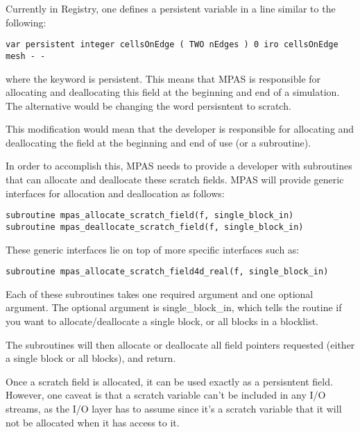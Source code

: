 \documentclass[11pt]{report}
\begin{document}
Currently in Registry, one defines a persistent variable in a line similar to the following:
\begin{lstlisting}
var persistent integer cellsOnEdge ( TWO nEdges ) 0 iro cellsOnEdge mesh - -
\end{lstlisting}

where the keyword is persistent. This means that MPAS is responsible for
allocating and deallocating this field at the beginning and end of a
simulation. The alternative would be changing the word persisntent to scratch.

This modification would mean that the developer is responsible for allocating
and deallocating the field at the beginning and end of use (or a subroutine). 

In order to accomplish this, MPAS needs to provide a developer with subroutines
that can allocate and deallocate these scratch fields. MPAS will provide
generic interfaces for allocation and deallocation as follows:

\begin{lstlisting}
subroutine mpas_allocate_scratch_field(f, single_block_in)
subroutine mpas_deallocate_scratch_field(f, single_block_in)
\end{lstlisting}

These generic interfaces lie on top of more specific interfaces such as:

\begin{lstlisting}
subroutine mpas_allocate_scratch_field4d_real(f, single_block_in)
\end{lstlisting}

Each of these subroutines takes one required argument and one optional
argument. The optional argument is single\_block\_in, which tells the routine
if you want to allocate/deallocate a single block, or all blocks in a
blocklist.

The subroutines will then allocate or deallocate all field pointers requested
(either a single block or all blocks), and return.

Once a scratch field is allocated, it can be used exactly as a persisntent
field. However, one caveat is that a scratch variable can't be included in any
I/O streams, as the I/O layer has to assume since it's a scratch variable that
it will not be allocated when it has access to it.


%
%
%
\end{document}
